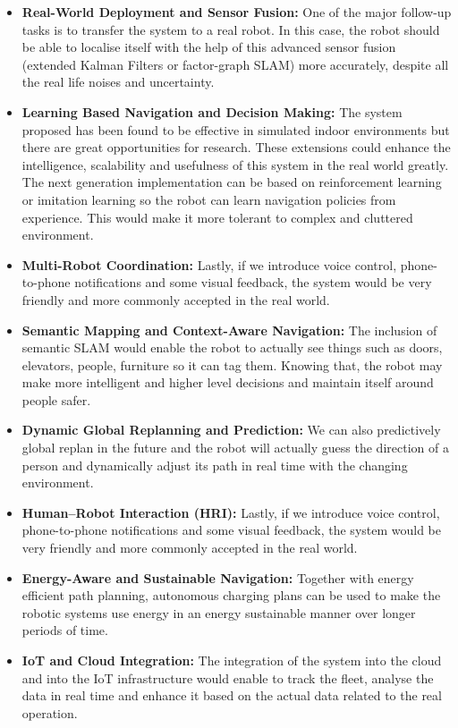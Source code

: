 \begin{itemize}
	\item \textbf{Real-World Deployment and Sensor Fusion:}  
	One of the major follow-up tasks is to transfer the system to a real robot. In this case, the robot should be able to localise itself with the help of this advanced sensor fusion (extended Kalman Filters or factor-graph SLAM) more accurately, despite all the real life noises and uncertainty.
	
	\item \textbf{Learning Based Navigation and Decision Making:}  
	The system proposed has been found to be effective in simulated indoor environments but there are great opportunities for research. These extensions could enhance the intelligence, scalability and usefulness of this system in the real world greatly. The next generation implementation can be based on reinforcement learning or imitation learning so the robot can learn navigation policies from experience. This would make it more tolerant to complex and cluttered environment.
	
	\item \textbf{Multi-Robot Coordination:}  
	Lastly, if we introduce voice control, phone-to-phone notifications and some visual feedback, the system would be very friendly and more commonly accepted in the real world.
	
	\item \textbf{Semantic Mapping and Context-Aware Navigation:}  
	The inclusion of semantic SLAM would enable the robot to actually see things such as doors, elevators, people, furniture so it can tag them. Knowing that, the robot may make more intelligent and higher level decisions and maintain itself around people safer.
	
	\item \textbf{Dynamic Global Replanning and Prediction:}  
	We can also predictively global replan in the future and the robot will actually guess the direction of a person and dynamically adjust its path in real time with the changing environment.
	
	\item \textbf{Human--Robot Interaction (HRI):}  
	Lastly, if we introduce voice control, phone-to-phone notifications and some visual feedback, the system would be very friendly and more commonly accepted in the real world.
	
	\item \textbf{Energy-Aware and Sustainable Navigation:}  
	Together with energy efficient path planning, autonomous charging plans can be used to make the robotic systems use energy in an energy sustainable manner over longer periods of time.
	
	\item \textbf{IoT and Cloud Integration:}  
	The integration of the system into the cloud and into the IoT infrastructure would enable to track the fleet, analyse the data in real time and enhance it based on the actual data related to the real operation.
\end{itemize}